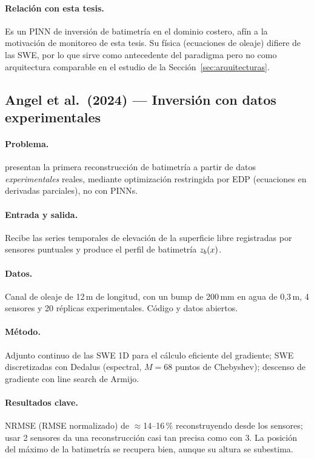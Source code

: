 \paragraph{Relación con esta tesis.}
Es un PINN de inversión de batimetría en el dominio costero, afín a la
motivación de monitoreo de esta tesis. Su física (ecuaciones de oleaje) difiere
de las SWE, por lo que sirve como antecedente del paradigma pero no como
arquitectura comparable en el estudio de la Sección~\ref{sec:arquitecturas}.

\subsection{Angel et al.\ (2024) --- Inversión con datos experimentales}
\label{sec:lit:angel}

\paragraph{Problema.}
\cite{angel2024} presentan la primera reconstrucción de batimetría a partir de
datos \emph{experimentales} reales, mediante optimización restringida por EDP
(ecuaciones en derivadas parciales), no con PINNs.

\paragraph{Entrada y salida.}
Recibe las series temporales de elevación de la superficie libre registradas por
sensores puntuales y produce el perfil de batimetría $z_b(x)$.

\paragraph{Datos.}
Canal de oleaje de 12\,m de longitud, con un bump de 200\,mm en agua de 0,3\,m,
4 sensores y 20 réplicas experimentales. Código y datos abiertos.

\paragraph{Método.}
Adjunto continuo de las SWE 1D para el cálculo eficiente del gradiente; SWE
discretizadas con Dedalus (espectral, $M = 68$ puntos de Chebyshev); descenso de
gradiente con line search de Armijo.

\paragraph{Resultados clave.}
NRMSE (RMSE normalizado) de $\approx$14--16\,\% reconstruyendo desde los
sensores; usar 2 sensores da una reconstrucción casi tan precisa como con 3. La
posición del máximo de la batimetría se recupera bien, aunque su altura se
subestima.

